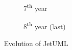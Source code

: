 \begin{figure}[ht]
    \medskip
    \begin{subfigure}{0.48\textwidth}
        \caption{7\textsuperscript{th} year} 
        \label{fig:JetUML_V3S7}
    \end{subfigure}\hspace*{\fill}
    \begin{subfigure}{0.48\textwidth}
        \caption{8\textsuperscript{th} year (last)} 
        \label{fig:JetUML_V3S8}
    \end{subfigure}
    
    \caption{Evolution of JetUML} 
    \label{fig:JetUML_V3_F1}
\end{figure}

